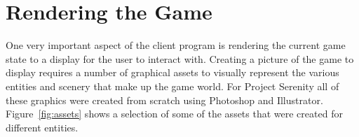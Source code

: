 \section{Rendering the Game}


% 
% 
% 
% 



% 

One very important aspect of the client program is rendering the current game state to a display for the user to interact with. Creating a picture of the game to display requires a number of graphical assets to visually represent the various entities and scenery that make up the game world. For Project Serenity all of these graphics were created from scratch using Photoshop and Illustrator. Figure~\ref{fig:assets} shows a selection of some of the assets that were created for different entities.


